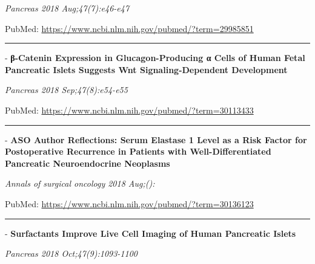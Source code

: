 \documentclass[]{article}
\begin{document}
\emph{Pancreas 2018 Aug;47(7):e46-e47}

PubMed: \url{https://www.ncbi.nlm.nih.gov/pubmed/?term=29985851}

{}

{}

\begin{center}\rule{0.5\linewidth}{\linethickness}\end{center}

 - \textbf{β-Catenin Expression in Glucagon-Producing α Cells of Human
Fetal Pancreatic Islets Suggests Wnt Signaling-Dependent Development}

\emph{Pancreas 2018 Sep;47(8):e54-e55}

PubMed: \url{https://www.ncbi.nlm.nih.gov/pubmed/?term=30113433}

{}

{}

\begin{center}\rule{0.5\linewidth}{\linethickness}\end{center}

 - \textbf{ASO Author Reflections: Serum Elastase 1 Level as a Risk
Factor for Postoperative Recurrence in Patients with Well-Differentiated
Pancreatic Neuroendocrine Neoplasms}

\emph{Annals of surgical oncology 2018 Aug;():}

PubMed: \url{https://www.ncbi.nlm.nih.gov/pubmed/?term=30136123}

{}

{}

\begin{center}\rule{0.5\linewidth}{\linethickness}\end{center}

 - \textbf{Surfactants Improve Live Cell Imaging of Human Pancreatic
Islets}

\emph{Pancreas 2018 Oct;47(9):1093-1100}
\end{document}

